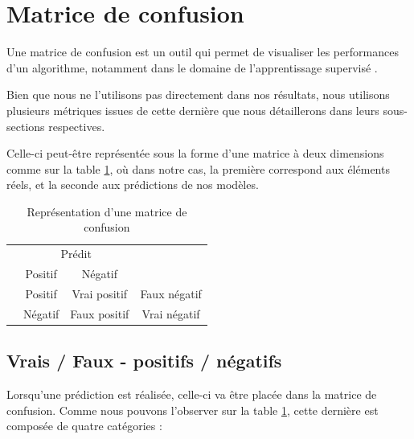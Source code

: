 \section{Matrice de confusion}

Une matrice de confusion est un outil qui permet de visualiser les performances d'un algorithme, notamment dans le domaine de l'apprentissage supervisé \cite{karimi_confusion_2021}.

Bien que nous ne l'utilisons pas directement dans nos résultats, nous utilisons plusieurs métriques issues de cette dernière que nous détaillerons dans leurs sous-sections respectives.

Celle-ci peut-être représentée sous la forme d'une matrice à deux dimensions comme sur la table \ref{tab:confusion_matrix}, où dans notre cas, la première correspond aux éléments réels, et la seconde aux prédictions de nos modèles.

\begin{table}[!ht]
    \caption{Représentation d'une matrice de confusion}
    \label{tab:confusion_matrix}
    \centering
    \begin{tabular}{|c|c|c|c|  }
        \hhline{----}
        \multicolumn{2}{|c|}{} & \multicolumn{2}{c|}{\cellcolor{gray!50} Prédit}\\
        \hhline{~~--}
        \multicolumn{2}{|c|}{} & \cellcolor{gray!25}Positif & \cellcolor{gray!25}Négatif\\
        \hhline{----}
        \cellcolor{gray!50} & \cellcolor{gray!25}Positif & Vrai positif & Faux négatif\\
        \arrayrulecolor{gray!50}
        \cline{1-1}
        \arrayrulecolor{black}
        \hhline{~---}
        \multirow{-2}{*}{\cellcolor{gray!50} Réel} & \cellcolor{gray!25}Négatif & Faux positif & Vrai négatif\\
        \hline
    \end{tabular}
\end{table}

\break

\subsection{Vrais / Faux - positifs / négatifs}

Lorsqu'une prédiction est réalisée, celle-ci va être placée dans la matrice de confusion. 
Comme nous pouvons l'observer sur la table \ref{tab:confusion_matrix}, cette dernière est composée de quatre catégories :\\

